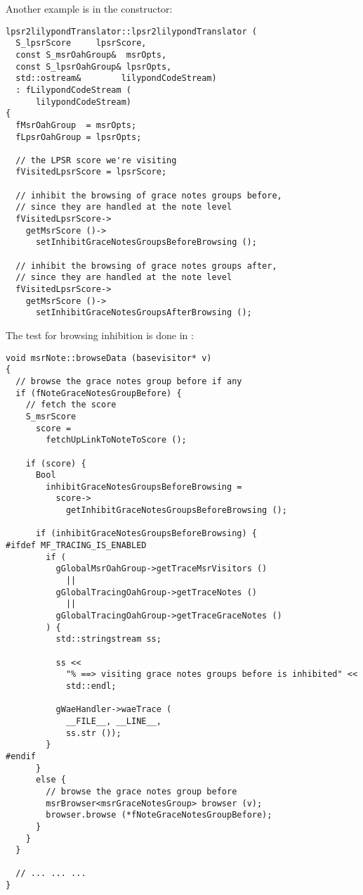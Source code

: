 Another example is in the  constructor:
\begin{lstlisting}[language=CPlusPlus]
lpsr2lilypondTranslator::lpsr2lilypondTranslator (
  S_lpsrScore     lpsrScore,
  const S_msrOahGroup&  msrOpts,
  const S_lpsrOahGroup& lpsrOpts,
  std::ostream&        lilypondCodeStream)
  : fLilypondCodeStream (
      lilypondCodeStream)
{
  fMsrOahGroup  = msrOpts;
  fLpsrOahGroup = lpsrOpts;

  // the LPSR score we're visiting
  fVisitedLpsrScore = lpsrScore;

  // inhibit the browsing of grace notes groups before,
  // since they are handled at the note level
  fVisitedLpsrScore->
    getMsrScore ()->
      setInhibitGraceNotesGroupsBeforeBrowsing ();

  // inhibit the browsing of grace notes groups after,
  // since they are handled at the note level
  fVisitedLpsrScore->
    getMsrScore ()->
      setInhibitGraceNotesGroupsAfterBrowsing ();
\end{lstlisting}

The test for browsing inhibition is done in :
\begin{lstlisting}[language=CPlusPlus]
void msrNote::browseData (basevisitor* v)
{
  // browse the grace notes group before if any
  if (fNoteGraceNotesGroupBefore) {
    // fetch the score
    S_msrScore
      score =
        fetchUpLinkToNoteToScore ();

    if (score) {
      Bool
        inhibitGraceNotesGroupsBeforeBrowsing =
          score->
            getInhibitGraceNotesGroupsBeforeBrowsing ();

      if (inhibitGraceNotesGroupsBeforeBrowsing) {
#ifdef MF_TRACING_IS_ENABLED
        if (
          gGlobalMsrOahGroup->getTraceMsrVisitors ()
            ||
          gGlobalTracingOahGroup->getTraceNotes ()
            ||
          gGlobalTracingOahGroup->getTraceGraceNotes ()
        ) {
          std::stringstream ss;

          ss <<
            "% ==> visiting grace notes groups before is inhibited" <<
            std::endl;

          gWaeHandler->waeTrace (
            __FILE__, __LINE__,
            ss.str ());
        }
#endif
      }
      else {
        // browse the grace notes group before
        msrBrowser<msrGraceNotesGroup> browser (v);
        browser.browse (*fNoteGraceNotesGroupBefore);
      }
    }
  }

  // ... ... ...
}
\end{lstlisting}


